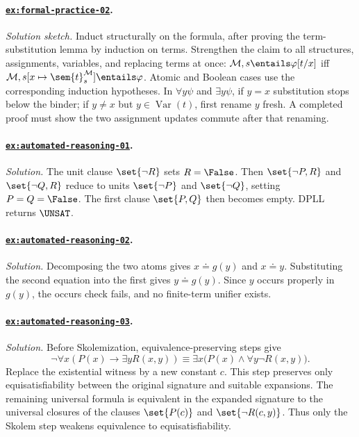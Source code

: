 \paragraph{\hyperref[ex:formal-practice-02]{\texttt{ex:formal-practice-02}}.}
\textit{Solution sketch.}  Induct structurally on the formula, after proving
the term-substitution lemma by induction on terms.  Strengthen the claim to all
structures, assignments, variables, and replacing terms at once:
\(\mathcal M,s\entails\varphi[t/x]\) iff
\(\mathcal M,s[x\mapsto\sem{t}^{\mathcal M}_s]\entails\varphi\).  Atomic and
Boolean cases use the corresponding induction hypotheses.  In
\(\forall y\psi\) and \(\exists y\psi\), if \(y=x\) substitution stops below
the binder; if \(y\ne x\) but \(y\in\operatorname{Var}(t)\), first rename
\(y\) fresh.  A
completed proof must show the two assignment updates commute after that
renaming.

\paragraph{\hyperref[ex:automated-reasoning-01]{\texttt{ex:automated-reasoning-01}}.}
\textit{Solution.}  The unit clause \(\set{\neg R}\) sets \(R=\False\).
Then \(\set{\neg P,R}\) and \(\set{\neg Q,R}\) reduce to units
\(\set{\neg P}\) and \(\set{\neg Q}\), setting \(P=Q=\False\).  The first
clause \(\set{P,Q}\) then becomes empty.  DPLL returns \(\UNSAT\).

\paragraph{\hyperref[ex:automated-reasoning-02]{\texttt{ex:automated-reasoning-02}}.}
\textit{Solution.}  Decomposing the two atoms gives
\(x\doteq g(y)\) and \(x\doteq y\).  Substituting the second equation into the
first gives \(y\doteq g(y)\).  Since \(y\) occurs properly in \(g(y)\), the
occurs check fails, and no finite-term unifier exists.

\paragraph{\hyperref[ex:automated-reasoning-03]{\texttt{ex:automated-reasoning-03}}.}
\textit{Solution.}  Before Skolemization, equivalence-preserving steps give
\[
\neg\forall x(P(x)\to\exists yR(x,y))
\equiv\exists x\bigl(P(x)\land\forall y\neg R(x,y)\bigr).
\]
Replace the existential witness by a new constant \(c\).  This step preserves
only equisatisfiability between the original signature and suitable expansions.
The remaining universal formula is equivalent in the expanded signature to the
universal closures of the clauses \(\set{P(c)}\) and
\(\set{\neg R(c,y)}\).  Thus only the Skolem step weakens equivalence to
equisatisfiability.

